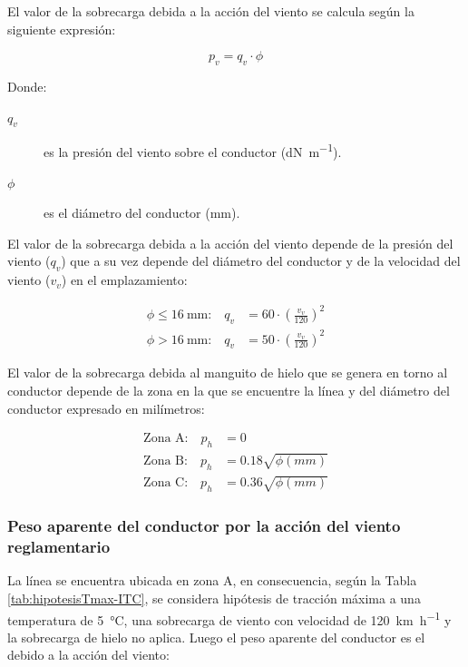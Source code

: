 El valor de la sobrecarga debida a la acción del viento se calcula según la siguiente expresión:

\begin{equation}
    p_v = q_v \cdot \phi
\end{equation}

Donde:
\begin{description}
  \item[$q_v$] es la presión del viento sobre el conductor (\si{\deca\newton\per\meter}).
  \item[$\phi$] es el diámetro del conductor (\si{\milli\meter}).
\end{description}

El valor de la sobrecarga debida a la acción del viento depende de la presión del viento ($q_v$) que a su vez depende del diámetro del conductor y de la velocidad del viento ($v_v$) en el emplazamiento:

\begin{align}
    \text{$\phi \leq \SI{16}{\milli\meter}$:}\quad q_v &= 60 \cdot (\frac{v_v}{120})^2
    \label{eq:presion-viento-<16} \\[0.5em]
    \text{$\phi > \SI{16}{\milli\meter}$:}\quad q_v &= 50 \cdot (\frac{v_v}{120})^2
    \label{eq:presion-viento->16}
\end{align}

El valor de la sobrecarga debida al manguito de hielo que se genera en torno al conductor depende de la zona en la que se encuentre la línea y del diámetro del conductor expresado en milímetros:

\begin{align}
    \text{Zona A:}\quad p_h &= 0
    \label{eq:sobrecarga-hielo-A} \\[0.5em]
    \text{Zona B:}\quad p_h &= 0.18 \sqrt{\phi(mm)}
    \label{eq:sobrecarga-hielo-B} \\[0.5em]
    \text{Zona C:}\quad p_h &= 0.36 \sqrt{\phi(mm)}
    \label{eq:sobrecarga-hielo-C}
\end{align}

\subsubsection{Peso aparente del conductor por la acción del viento reglamentario}
\label{subsubsec:hipotesisTmax-papV}
La línea se encuentra ubicada en zona A, en consecuencia, según la Tabla \ref{tab:hipotesisTmax-ITC}, se considera hipótesis de tracción máxima a una temperatura de \SI{5}{\celsius}, una sobrecarga de viento con velocidad de \SI{120}{\kilo\meter\per\hour} y la sobrecarga de hielo no aplica. Luego el peso aparente del conductor es el debido a la acción del viento:

